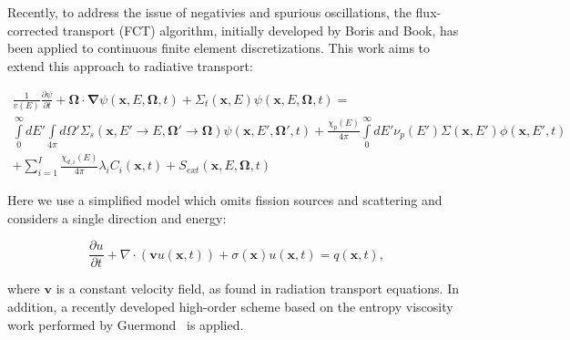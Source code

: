 Recently, to address the issue of negativies and spurious oscillations,
the flux-corrected transport (FCT) algorithm,
initially developed by Boris and Book\cite{borisbook},
has been applied to continuous finite element discretizations.
This work aims to extend this approach to radiative
transport:

\begin{multline}
  \frac{1}{v(E)}\frac{\partial\psi}{\partial t}
  + \mathbf{\Omega}\cdot\mathbf{\nabla}\psi(\mathbf{x},E,\mathbf{\Omega},t)
	+ \Sigma_t(\mathbf{x},E)\psi(\mathbf{x},E,\mathbf{\Omega},t)
  = \\
  \int\limits_0^\infty dE'\int\limits_{4\pi}d\Omega'\Sigma_s(\mathbf{x},
    E'\rightarrow E,\mathbf{\Omega}'\rightarrow\mathbf{\Omega})
    \psi(\mathbf{x},E',\mathbf{\Omega}',t)
    + \frac{\chi_p(E)}{4\pi}\int\limits_0^\infty dE'\nu_p(E')\Sigma(\mathbf{x},E')
    \phi(\mathbf{x},E',t)\\
  + \sum\limits_{i=1}^I\frac{\chi_{d,i}(E)}{4\pi}\lambda_i C_i(\mathbf{x},t)
  + S_{ext}(\mathbf{x},E,\mathbf{\Omega},t)
\end{multline}

Here we use a simplified model which omits fission sources and
scattering and considers a single direction and energy:

\begin{equation}\label{eq:tr}
  \frac{\partial u}{\partial t} + \nabla\cdot(\mathbf{v}u(\mathbf{x},t))
  + \sigma(\mathbf{x})u(\mathbf{x},t) = q(\mathbf{x},t),
\end{equation}

where $\mathbf{v}$ is a constant velocity field, as found in
radiation transport equations. In addition, a recently developed
high-order scheme based on the entropy viscosity work performed
by Guermond~\cite{guermond_secondorder} is applied.

